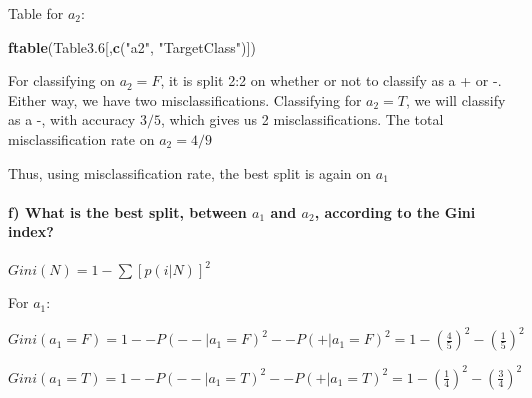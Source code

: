 \documentclass[]{article}
\newenvironment{Shaded}{\begin{snugshade}}{\end{snugshade}}
\newcommand{\FloatTok}[1]{\textcolor[rgb]{0.00,0.00,0.81}{#1}}
\newcommand{\KeywordTok}[1]{\textcolor[rgb]{0.13,0.29,0.53}{\textbf{#1}}}
\newcommand{\NormalTok}[1]{#1}
\newcommand{\StringTok}[1]{\textcolor[rgb]{0.31,0.60,0.02}{#1}}
\let\oldparagraph\paragraph
\renewcommand{\paragraph}[1]{\oldparagraph{#1}\mbox{}}
\begin{document}
Table for \(a_2\):

\begin{Shaded}
\begin{Highlighting}[]
\KeywordTok{ftable}\NormalTok{(Table3}\FloatTok{.6}\NormalTok{[,}\KeywordTok{c}\NormalTok{(}\StringTok{"a2"}\NormalTok{, }\StringTok{"TargetClass"}\NormalTok{)])}
\end{Highlighting}
\end{Shaded}

For classifying on \(a_2 = F\), it is split 2:2 on whether or not to
classify as a + or -. Either way, we have two misclassifications.
Classifying for \(a_2 = T\), we will classify as a -, with accuracy
\(3/5\), which gives us 2 misclassifications. The total
misclassification rate on \(a_2 = 4/9\)

Thus, using misclassification rate, the best split is again on \(a_1\)

\hypertarget{f-what-is-the-best-split-between-a_1-and-a_2-according-to-the-gini-index}{%
\paragraph{\texorpdfstring{f) What is the best split, between \(a_1\)
and \(a_2\), according to the Gini
index?}{f) What is the best split, between a\_1 and a\_2, according to the Gini index?}}\label{f-what-is-the-best-split-between-a_1-and-a_2-according-to-the-gini-index}}

\(Gini(N) = 1 - \sum [p(i|N)]^2\)

For \(a_1\):

\(Gini(a_1 = F )=1 −- P(-− | a_1 = F )^2 -− P(+ | a_1 = F )^2 = 1 − ( \frac{4}{5})^2 − (\frac{1}{5})^2\)

\(Gini(a_1 = T )= 1 -− P ( -− | a_1 = T )^2 −- P ( + | a_1 = T )^2 = 1 − ( \frac{1}{4} )^2 − ( \frac{3}{4} )^2\)
\end{document}
